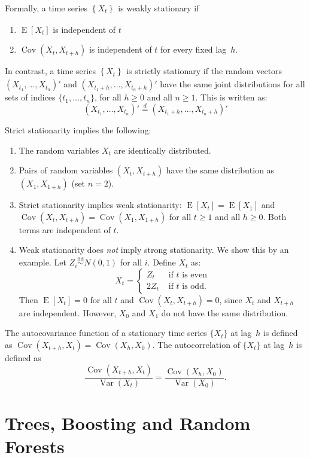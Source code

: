\documentclass[11pt,a4]{article}
\DeclareMathOperator{\cov}{Cov}
\DeclareMathOperator{\E}{E}
\DeclareMathOperator{\var}{Var}
\newcommand{\ts}[3]{\ensuremath{\left \{ #1 \right \}_{#2}^{#3}}}
\newcommand{\eqd}{\ensuremath{\stackrel{d}{=}}}
\newcommand{\iid}{\ensuremath{\stackrel{\text{iid}}{\sim}}}
\begin{document}
Formally, a time series $\ts{X_t}{}{}$ is weakly stationary if 
\begin{enumerate}
	\item $\E[X_t]$ is independent of $t$
	\item $\cov(X_t, X_{t + h})$ is independent of $t$ for every fixed lag~$h$.
\end{enumerate} 
In contrast, a time series $\ts{X_t}{}{}$ is strictly stationary if the random vectors $(X_{t_1}, \ldots, X_{t_n})'$ and $(X_{t_1 + h}, \ldots, X_{t_n + h})'$
have the same joint distributions for all sets of indices 
$\{t_1, \ldots, t_n\}$, for all $h \geq 0$ and all $n \geq 1$. This is written 
as:
\[
(X_{t_1}, \ldots, X_{t_n})' \eqd (X_{t_1 + h}, \ldots, X_{t_n + h})'
\] 

Strict stationarity implies the following:
\begin{enumerate}
	\item The random variables $X_t$ are identically distributed.
	
	\item Pairs of random variables $(X_t, X_{t + h})$ have the same 
	distribution as $(X_1, X_{1 + h})$ (set $n = 2$).
	
	\item Strict stationarity implies weak stationarity: $\E[X_t] = \E[X_1]$
	and $\cov(X_t, X_{t + h}) = \cov(X_1, X_{1 + h})$ for all $t \geq 1$ and 
	all $h \geq 0$. Both terms are independent of $t$.
	
	\item Weak stationarity does \emph{not} imply strong stationarity. We show
	this by an example. Let $Z_i \iid N(0, 1)$ for all $i$. Define $X_t$ as:
	\[
		X_t = \left \{ \begin{array}{ll}
							Z_t   & \text{ if $t$ is even}\\
							2 Z_t & \text{ if $t$ is odd}.   
					   \end{array}	\right .
	\] 
	Then $\E[X_t] = 0$ for all $t$ and $\cov(X_t, X_{t + h}) = 0$, since $X_t$ 
	and $X_{t + h}$ are independent. However, $X_0$ and $X_1$ do not have the 
	same distribution.
\end{enumerate}

The autocovariance function of a stationary time series $\{ X_t \}$ at lag~$h$
is defined as $\cov(X_{t + h}, X_{t}) = \cov(X_{h}, X_{0})$. The autocorrelation
of $\{ X_t \}$ at lag~$h$ is defined as 
\[
	\frac{ \cov(X_{t + h}, X_t) }{ \var(X_t) } = 
	\frac{ \cov( X_h, X_0 )}{ \var(X_0) }.
\]   

\section{Trees, Boosting and Random Forests}
\end{document}
